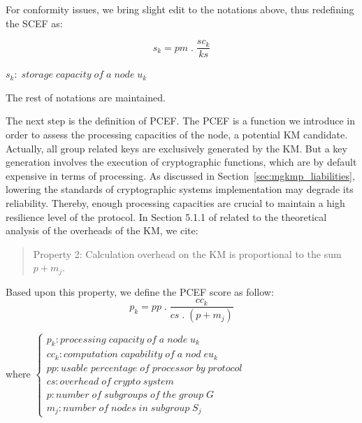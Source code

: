 For conformity issues, we bring slight edit to the notations above, thus redefining the SCEF as:

\begin{equation}\label{eq2}
	s_k = pm \; .\; \frac{sc_k}{ks}
\end{equation}

\begin{math}
s_k:\; storage\; capacity\; of\; a\; node\; u_k
\end{math}

The rest of notations are maintained.

The next step is the definition of PCEF. The PCEF is a function we introduce in order to assess the processing capacities of the node, a potential KM candidate. Actually, all group related keys are exclusively generated by the KM. But a key generation involves the execution of cryptographic functions, which are by default expensive in terms of processing. As discussed in Section~\ref{sec:mgkmp_liabilities}, lowering the standards of cryptographic systems implementation may degrade its reliability. Thereby, enough processing capacities are crucial to maintain a high resilience level of the protocol. In Section 5.1.1 of \cite{kandi_versatile_2020} related to the theoretical analysis of the overheads of the KM, we cite:

\begin{quote}
	Property 2: Calculation overhead on the KM is proportional to the sum $p+m_j$.
\end{quote}

Based upon this property, we define the PCEF score as follow:
\begin{equation}\label{eq2}
	p_k = pp \; .\; \frac{cc_k}{cs \; .\; \left( p + m_j \right)}
\end{equation}

where
\begin{math}
	\left\{
	\begin{array}{l}
		p_k: processing\; capacity\; of\; a\; node\; u_k\\
		cc_k: computation\; capability\; of\; a\; nod\;e u_k\\
		pp: usable\; percentage\; of\; processor\; by\; protocol\\
		cs: overhead\; of\; crypto\; system\\
		p: number\; of\; subgroups\; of\; the\; group\; G\\
		m_j: number\; of\; nodes\; in\; subgroup\; S_j
	\end{array}
	\right.
\end{math}\\

